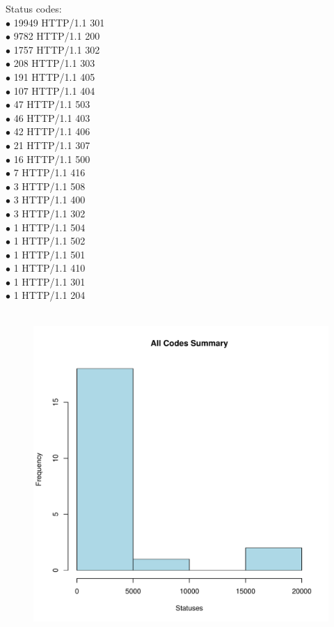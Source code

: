 \documentclass[12pt]{article}
\begin{document}
Status codes:\\
$\bullet$  19949 HTTP/1.1 301\\
$\bullet$   9782 HTTP/1.1 200\\
$\bullet$   1757 HTTP/1.1 302\\
$\bullet$    208 HTTP/1.1 303\\
$\bullet$    191 HTTP/1.1 405\\
$\bullet$    107 HTTP/1.1 404\\
$\bullet$     47 HTTP/1.1 503\\
$\bullet$     46 HTTP/1.1 403\\
$\bullet$     42 HTTP/1.1 406\\
$\bullet$     21 HTTP/1.1 307\\
$\bullet$     16 HTTP/1.1 500\\
$\bullet$      7 HTTP/1.1 416\\
$\bullet$      3 HTTP/1.1 508\\
$\bullet$      3 HTTP/1.1 400\\
$\bullet$      3 HTTP/1.1 302\\
$\bullet$      1 HTTP/1.1 504\\
$\bullet$      1 HTTP/1.1 502\\
$\bullet$      1 HTTP/1.1 501\\
$\bullet$      1 HTTP/1.1 410\\
$\bullet$      1 HTTP/1.1 301\\
$\bullet$      1 HTTP/1.1 204

\begin{figure}[H]
    \centering
    \includegraphics{statusCodesPlot.pdf}
\end{figure}
\end{document}
